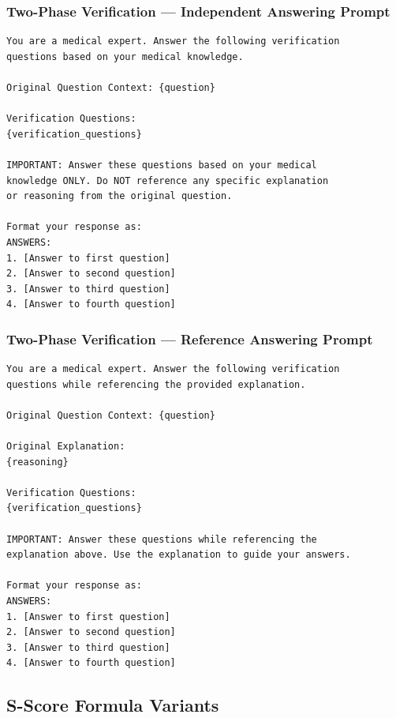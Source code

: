\documentclass[10pt]{article}
\begin{document}
\subsubsection*{Two-Phase Verification — Independent Answering Prompt}

\begin{verbatim}
You are a medical expert. Answer the following verification
questions based on your medical knowledge.

Original Question Context: {question}

Verification Questions:
{verification_questions}

IMPORTANT: Answer these questions based on your medical
knowledge ONLY. Do NOT reference any specific explanation
or reasoning from the original question.

Format your response as:
ANSWERS:
1. [Answer to first question]
2. [Answer to second question]
3. [Answer to third question]
4. [Answer to fourth question]
\end{verbatim}

\subsubsection*{Two-Phase Verification — Reference Answering Prompt}

\begin{verbatim}
You are a medical expert. Answer the following verification
questions while referencing the provided explanation.

Original Question Context: {question}

Original Explanation:
{reasoning}

Verification Questions:
{verification_questions}

IMPORTANT: Answer these questions while referencing the
explanation above. Use the explanation to guide your answers.

Format your response as:
ANSWERS:
1. [Answer to first question]
2. [Answer to second question]
3. [Answer to third question]
4. [Answer to fourth question]
\end{verbatim}

\subsection{S-Score Formula Variants}
\label{app:sscore}
\end{document}
